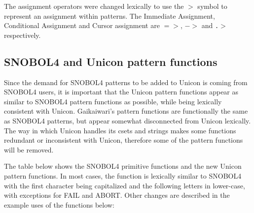 \documentclass{article}
\begin{document}
The assignment operators were changed lexically to use the \texttt{$>$} symbol to represent an assignment within patterns.  The Immediate Assignment, Conditional Assignment and Cursor assignment are \texttt{$=>$}, \texttt{$->$} and \texttt{.$>$} respectively.

\vspace{1 pc}
\subsection{SNOBOL4 and Unicon pattern functions}
Since the demand for SNOBOL4 patterns to be added to Unicon is coming from SNOBOL4 users, it is important that the Unicon pattern functions appear as similar to SNOBOL4 pattern functions as possible, while being lexically consistent with Unicon.  Gaikaiwari's pattern functions 
are functionally the same as SNOBOL4 patterns, but appear somewhat disconnected from Unicon lexically.  The way in which Unicon handles its csets and strings makes some functions redundant or inconsistent with Unicon, therefore some of the pattern functions will be removed. 

The table below shows the SNOBOL4 primitive functions and the new Unicon pattern functions.  In most cases, the function is lexically similar to SNOBOL4 with the first character being capitalized and the following letters in lower-case, with exceptions for FAIL and ABORT.  Other changes are described in the example uses of the functions below: 
\end{document}
